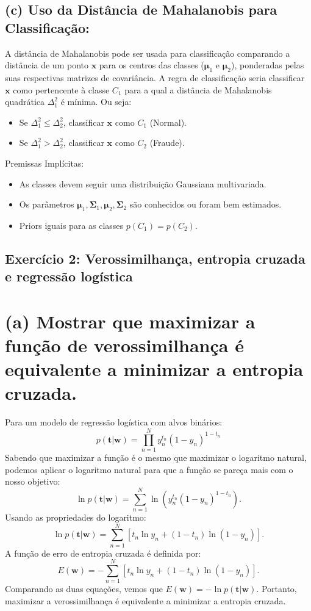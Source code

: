 \documentclass[conference]{IEEEtran}
\begin{document}
\subsection*{(c) Uso da Distância de Mahalanobis para Classificação:}
A distância de Mahalanobis pode ser usada para classificação comparando a distância de um ponto \(\mathbf{x}\) para os centros das classes (\(\boldsymbol{\mu}_1\) e \(\boldsymbol{\mu}_2\)), ponderadas pelas suas respectivas matrizes de covariância. A regra de classificação seria classificar \(\mathbf{x}\) como pertencente à classe \(C_1\) para a qual a distância de Mahalanobis quadrática \(\Delta_1^2\) é mínima. Ou seja:
\begin{itemize}
    \item Se \(\Delta_1^2 \leqslant \Delta_2^2\), classificar \(\mathbf{x}\) como \(C_1\) (Normal).
    \item Se \(\Delta_1^2 > \Delta_2^2\), classificar \(\mathbf{x}\) como \(C_2\) (Fraude).
\end{itemize}

Premissas Implícitas:
\begin{itemize}
    \item As classes devem seguir uma distribuição Gaussiana multivariada. 
    \item Os parâmetros $\boldsymbol{\mu}_1, \boldsymbol{\Sigma}_1, \boldsymbol{\mu}_2, \boldsymbol{\Sigma}_2$ são conhecidos ou foram bem estimados.
    \item Priors iguais para as classes \(p(C_1) = p(C_2)\).
\end{itemize}

\subsection{Exercício 2: Verossimilhança, entropia cruzada e regressão logística}
\label{subsec:ex2}
\section{(a) Mostrar que maximizar a função de verossimilhança é equivalente a minimizar a entropia cruzada.}
Para um modelo de regressão logística com alvos binários:
\[
p(\mathbf{t} | \mathbf{w}) = \prod_{n=1}^{N} y_n^{t_n} (1 - y_n)^{1 - t_n}
\]
Sabendo que maximizar a função é o mesmo que maximizar o logaritmo natural, podemos aplicar o logaritmo natural para que a função se pareça mais com o nosso objetivo:
\[
\ln p(\mathbf{t} | \mathbf{w}) = \sum_{n=1}^{N} \ln \left( y_n^{t_n} (1 - y_n)^{1 - t_n} \right).
\]
Usando as propriedades do logaritmo:
\[
\ln p(\mathbf{t} | \mathbf{w}) = \sum_{n=1}^{N} \left[ t_n \ln y_n + (1 - t_n) \ln(1 - y_n) \right].
\]
A função de erro de entropia cruzada é definida por:
\[
E(\mathbf{w}) = -\sum_{n=1}^{N} \left[ t_n \ln y_n + (1 - t_n) \ln(1 - y_n) \right].
\]
Comparando as duas equações, vemos que $E(\mathbf{w}) = -\ln p(\mathbf{t} | \mathbf{w})$. Portanto, maximizar a verossimilhança é equivalente a minimizar a entropia cruzada.
\end{document}
